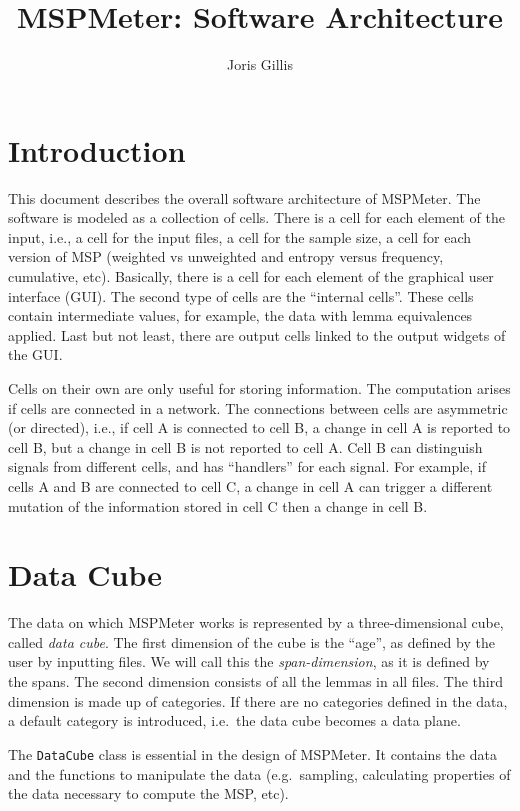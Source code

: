 \documentclass{article}
\title{MSPMeter: Software Architecture}
\author{Joris Gillis}
\begin{document}
\maketitle


\section{Introduction}

This document describes the overall software architecture of MSPMeter. The software is modeled as a collection of cells. There is a cell for each element of the input, i.e., a cell for the input files, a cell for the sample size, a cell for each version of MSP (weighted vs unweighted and entropy versus frequency, cumulative, etc). Basically, there is a cell for each element of the graphical user interface (GUI). The second type of cells are the ``internal cells''. These cells contain intermediate values, for example, the data with lemma equivalences applied. Last but not least, there are output cells linked to the output widgets of the GUI. 

Cells on their own are only useful for storing information. The computation arises if cells are connected in a network. The connections between cells are asymmetric (or directed), i.e., if cell A is connected to cell B, a change in cell A is reported to cell B, but a change in cell B is not reported to cell A. Cell B can distinguish signals from different cells, and has ``handlers'' for each signal. For example, if cells A and B are connected to cell C, a change in cell A can trigger a different mutation of the information stored in cell C then a change in cell B. 


\section{Data Cube}

The data on which MSPMeter works is represented by a three-dimensional cube, called \emph{data cube}.  The first dimension of the cube is the ``age'', as defined by the user by inputting files. We will call this the \emph{span-dimension}, as it is defined by the spans. The second dimension consists of all the lemmas in all files. The third dimension is made up of categories. If there are no categories defined in the data, a default category is introduced, i.e.\ the data cube becomes a data plane. 

The \texttt{DataCube} class is essential in the design of MSPMeter. It contains the data and the functions to manipulate the data (e.g.\ sampling, calculating properties of the data necessary to compute the MSP, etc).
\end{document}

